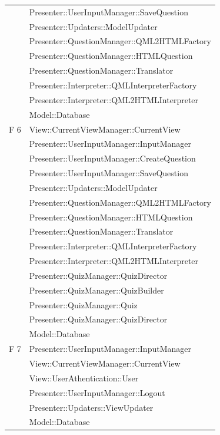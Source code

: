\documentclass[a4paper,11pt]{article}
\begin{document}
\begin{longtable}{p{}p{}}
		& Presenter::UserInputManager::SaveQuestion	\\
		& Presenter::Updaters::ModelUpdater\\
		& Presenter::QuestionManager::QML2HTMLFactory	 \\
			& Presenter::QuestionManager::HTMLQuestion	 \\
			& Presenter::QuestionManager::Translator		 \\	
			& Presenter::Interpreter::QMLInterpreterFactory	 \\
			& Presenter::Interpreter::QML2HTMLInterpreter\\
			& Model::Database\\
\midrule
F 6		& View::CurrentViewManager::CurrentView\\
& Presenter::UserInputManager::InputManager	\\	
		& Presenter::UserInputManager::CreateQuestion\\
		& Presenter::UserInputManager::SaveQuestion	\\
		& Presenter::Updaters::ModelUpdater\\
		& Presenter::QuestionManager::QML2HTMLFactory	 \\
			& Presenter::QuestionManager::HTMLQuestion	 \\
			& Presenter::QuestionManager::Translator		 \\	
			& Presenter::Interpreter::QMLInterpreterFactory	 \\
			& Presenter::Interpreter::QML2HTMLInterpreter\\
			& Presenter::QuizManager::QuizDirector\\
		& Presenter::QuizManager::QuizBuilder\\
		& Presenter::QuizManager::Quiz\\
		& Presenter::QuizManager::QuizDirector\\
		& Model::Database\\
\midrule
F 7 & Presenter::UserInputManager::InputManager	\\	
& View::CurrentViewManager::CurrentView\\
& View::UserAthentication::User\\
& Presenter::UserInputManager::Logout	\\	
& Presenter::Updaters::ViewUpdater\\
& Model::Database\\
			
	\end{longtable}
	
\end{document}
